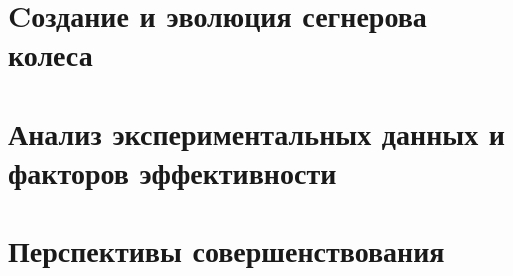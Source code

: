 \documentclass[referat]{SCWorks}
\begin{document}

\date{2026}

\maketitle

\secNumbering

\tableofcontents




\intro %

\section{Cоздание и эволюция сегнерова колеса}

\section{Анализ экспериментальных данных и факторов эффективности}

\section{Перспективы совершенствования}


\conclusion

\nocite{*}



\appendix
\end{document}
